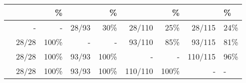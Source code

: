 \begin{tabular}{lrrrrrrr}
\toprule
{} &  &  \% &  &  \% &    &  \% &    &  \% \\
\midrule
{} &      - &        - &  28/93 &      30\% &   28/110 &      25\% &   28/115 &      24\% \\
 &  28/28 &     100\% &      - &        - &   93/110 &      85\% &   93/115 &      81\% \\
 &  28/28 &     100\% &  93/93 &     100\% &        - &        - &  110/115 &      96\% \\
 &  28/28 &     100\% &  93/93 &     100\% &  110/110 &     100\% &        - &        - \\
\bottomrule
\end{tabular}
